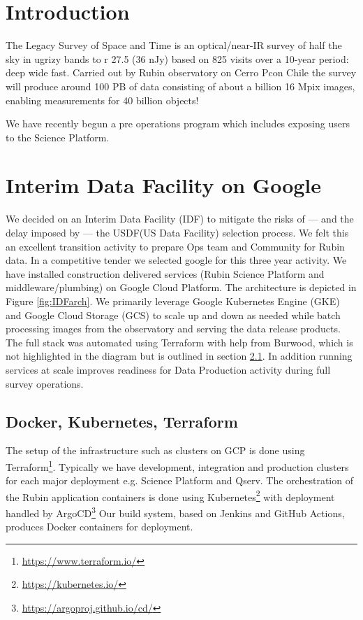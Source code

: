 \section{Introduction}

The Legacy Survey of Space and Time is an optical/near-IR survey of half the sky in ugrizy bands to r 27.5 (36 nJy) based on 825 visits over a 10-year period: deep wide fast.
Carried out by Rubin observatory on Cerro Pcon Chile the survey will produce around 100 PB of data consisting of about a billion 16 Mpix images, enabling measurements for 40 billion objects! \cite{arXiv:0805.2366}

We have recently begun a pre operations program which includes exposing users to the Science Platform.


\section{Interim Data Facility on Google }
We decided on an Interim Data Facility (IDF) to mitigate the risks of — and the delay imposed by — the USDF(US Data Facility)  selection process.
We felt this an excellent transition activity to prepare Ops team and Community for Rubin data.
In a competitive tender we selected google for this three year activity.
We have installed construction delivered services (Rubin Science Platform and middleware/plumbing) on Google Cloud Platform.
The architecture is depicted in Figure \ref{fig:IDFarch}.
We primarily leverage Google Kubernetes Engine (GKE) and Google Cloud Storage (GCS) to scale up and down as needed while batch processing images from the observatory and serving the data release products.
The full stack was automated using Terraform with help from Burwood, which is not highlighted in the diagram but is outlined in section \ref{sec:infra}.
In addition running services at scale improves readiness for Data Production activity during full survey operations.







\subsection{ Docker, Kubernetes, Terraform} \label{sec:infra}
The setup of the infrastructure such as clusters on GCP is done using Terraform\footnote{\url{https://www.terraform.io/}}.
Typically we have development, integration and production clusters for each major deployment e.g. Science Platform and Qserv.
The orchestration of the Rubin application containers is done using Kubernetes\footnote{\url{https://kubernetes.io/}} with deployment handled by ArgoCD\footnote{\url{https://argoproj.github.io/cd/}}
Our build system, based on Jenkins and GitHub Actions,  produces Docker containers for deployment.

